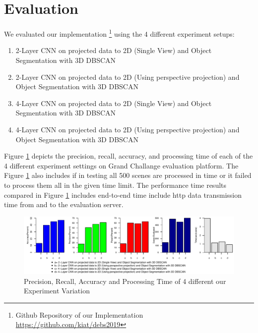 \section{Evaluation}\label{sec:Evaluation}

We evaluated our implementation \footnote{Github Repository
of our Implementation \url{https://github.com/kiat/debs2019}} using the 4 different experiment
setups:
\begin{enumerate}
  \item 2-Layer CNN on projected data to 2D (Single View) and Object Segmentation with 3D DBSCAN
  \item 2-Layer CNN on projected data to 2D (Using perspective projection) and Object Segmentation with 3D DBSCAN
  \item 4-Layer CNN on projected data to 2D (Single View) and Object Segmentation with 3D DBSCAN
  \item 4-Layer CNN on projected data to 2D (Using perspective projection) and Object Segmentation with 3D DBSCAN
\end{enumerate}

Figure \ref{fig:evaluation2} depicts the precision, recall, accuracy, and processing time of each of the 4 different experiment settings on 
Grand Challange evaluation platform. The Figure \ref{fig:evaluation2} also includes if in testing
all 500 scenes are processed in time or it failed to process them all in the given time limit. The
performance time results compared in Figure \ref{fig:evaluation2} includes end-to-end time include
http  data transmission time from and to the evaluation server. 


\begin{figure}[htp]
\begin{center}
  \includegraphics[width=1\linewidth]{images/evaluation2.pdf}
  \caption{Precision, Recall, Accuracy and Processing Time of 4 different our Experiment Variation}
  \label{fig:evaluation2}
\end{center}
\end{figure}

